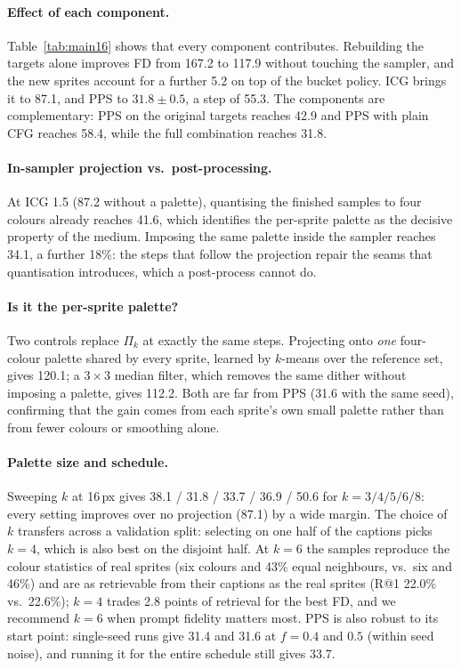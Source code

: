 \documentclass{article} %
\begin{document}
\paragraph{Effect of each component.}
Table~\ref{tab:main16} shows that every component contributes. Rebuilding the targets alone improves FD from 167.2 to
117.9 without touching the sampler, and the new sprites account for a further 5.2 on top of the bucket policy. ICG
brings it to 87.1, and PPS to $31.8\pm0.5$, a step of 55.3. The components are complementary: PPS on the original
targets reaches 42.9 and PPS with plain CFG reaches 58.4, while the full combination reaches 31.8.

\paragraph{In-sampler projection vs.\ post-processing.}
At ICG 1.5 (87.2 without a palette), quantising the finished samples to four colours already reaches 41.6, which
identifies the per-sprite palette as the decisive property of the medium. Imposing the same palette inside the sampler
reaches 34.1, a further 18\%: the steps that follow the projection repair the seams that quantisation introduces, which
a post-process cannot do.

\paragraph{Is it the per-sprite palette?}
Two controls replace $\Pi_k$ at exactly the same steps. Projecting onto \emph{one} four-colour palette shared by every
sprite, learned by $k$-means over the reference set, gives 120.1; a $3\times3$ median filter, which removes the same
dither without imposing a palette, gives 112.2. Both are far from PPS (31.6 with the same seed), confirming that the gain
comes from each sprite's own small palette rather than from fewer colours or smoothing alone.

\paragraph{Palette size and schedule.}
Sweeping $k$ at 16\,px gives 38.1 / 31.8 / 33.7 / 36.9 / 50.6 for $k=3/4/5/6/8$: every setting improves over no
projection (87.1) by a wide margin. The choice of $k$ transfers across a validation split: selecting on one half of the
captions picks $k=4$, which is also best on the disjoint half. At $k=6$ the samples reproduce the colour statistics of
real sprites (six colours and 43\% equal neighbours, vs.\ six and 46\%) and are as retrievable from their captions as
the real sprites (R@1 22.0\% vs.\ 22.6\%); $k=4$ trades 2.8 points of retrieval for the best FD, and we recommend
$k=6$ when prompt fidelity matters most. PPS is also robust to its start point: single-seed runs give 31.4 and 31.6 at
$f=0.4$ and $0.5$ (within seed noise), and running it for the entire schedule still gives 33.7.
\end{document}
